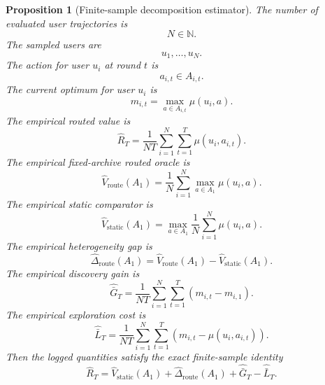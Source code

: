 \documentclass{article} %
\newtheorem{proposition}[theorem]{Proposition}
\begin{document}
\begin{proposition}[Finite-sample decomposition estimator]
\label{prop:6}
The number of evaluated user trajectories is
\begin{equation}
\label{eq:app-fourth-finite-n}
N\in\mathbb{N}.
\end{equation}
The sampled users are
\begin{equation}
\label{eq:app-fourth-finite-users}
u_1,\ldots,u_N.
\end{equation}
The action for user \(u_i\) at round \(t\) is
\begin{equation}
\label{eq:app-fourth-finite-action}
a_{i,t}\in A_{i,t}.
\end{equation}
The current optimum for user \(u_i\) is
\begin{equation}
\label{eq:app-fourth-finite-m}
m_{i,t}
=
\max_{a\in A_{i,t}}
\mu(u_i,a).
\end{equation}
The empirical routed value is
\begin{equation}
\label{eq:app-fourth-finite-r}
\widehat R_T
=
\frac{1}{NT}
\sum_{i=1}^{N}
\sum_{t=1}^{T}
\mu(u_i,a_{i,t}).
\end{equation}
The empirical fixed-archive routed oracle is
\begin{equation}
\label{eq:app-fourth-finite-vroute}
\widehat V_{\mathrm{route}}(A_1)
=
\frac{1}{N}
\sum_{i=1}^{N}
\max_{a\in A_1}
\mu(u_i,a).
\end{equation}
The empirical static comparator is
\begin{equation}
\label{eq:app-fourth-finite-vstatic}
\widehat V_{\mathrm{static}}(A_1)
=
\max_{a\in A_1}
\frac{1}{N}
\sum_{i=1}^{N}
\mu(u_i,a).
\end{equation}
The empirical heterogeneity gap is
\begin{equation}
\label{eq:app-fourth-finite-delta}
\widehat\Delta_{\mathrm{route}}(A_1)
=
\widehat V_{\mathrm{route}}(A_1)
-
\widehat V_{\mathrm{static}}(A_1).
\end{equation}
The empirical discovery gain is
\begin{equation}
\label{eq:app-fourth-finite-g}
\widehat{\bar G}_T
=
\frac{1}{NT}
\sum_{i=1}^{N}
\sum_{t=1}^{T}
(m_{i,t}-m_{i,1}).
\end{equation}
The empirical exploration cost is
\begin{equation}
\label{eq:app-fourth-finite-l}
\widehat{\bar L}_T
=
\frac{1}{NT}
\sum_{i=1}^{N}
\sum_{t=1}^{T}
(m_{i,t}-\mu(u_i,a_{i,t})).
\end{equation}
Then the logged quantities satisfy the exact finite-sample identity
\begin{equation}
\label{eq:app-fourth-finite-identity}
\widehat R_T
=
\widehat V_{\mathrm{static}}(A_1)
+
\widehat\Delta_{\mathrm{route}}(A_1)
+
\widehat{\bar G}_T
-
\widehat{\bar L}_T.
\end{equation}
\end{proposition}
\end{document}
